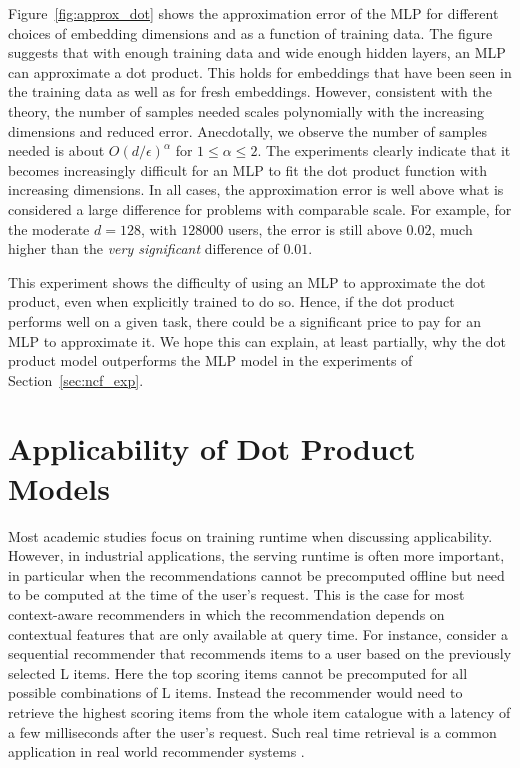 \documentclass{article}
\begin{document}
Figure~\ref{fig:approx_dot} shows the approximation error of the MLP for different choices of embedding dimensions and as a function of training data.
The figure suggests that with enough training data and wide enough hidden layers, an MLP can approximate a dot product.
This holds for embeddings that have been seen in the training data as well as for fresh embeddings.
However, consistent with the theory, the number of samples needed scales polynomially with the increasing dimensions and reduced error. Anecdotally, we observe the number of samples needed is about $O(d/\epsilon)^{\alpha}$ for $1\leq \alpha \leq 2$.
The experiments clearly indicate that it becomes increasingly difficult for an MLP to fit the dot product function with increasing dimensions.
In all cases, the approximation error is well above what is considered a large difference for problems with comparable scale. For example, for the moderate $d=128$, with $128000$ users, the error is still above $0.02$, much higher than the \emph{very significant} difference of $0.01$.

This experiment shows the difficulty of using an MLP to approximate the dot product, even when explicitly trained to do so.
Hence, if the dot product performs well on a given task, there could be a significant price to pay for an MLP to approximate it.
We hope this can explain, at least partially, why the dot product model outperforms the MLP model in the experiments of Section~\ref{sec:ncf_exp}.


\section{Applicability of Dot Product Models}
\label{sec:serving}

Most academic studies focus on training runtime when discussing applicability.
However, in industrial applications, the serving runtime is often more important, in particular when the recommendations cannot be precomputed offline but need to be computed at the time of the user's request. This is the case for most context-aware recommenders in which the recommendation depends on contextual features that are only available at query time.
For instance, consider a sequential recommender that recommends items to a user based on the previously selected L items.
Here the top scoring items cannot be precomputed for all possible combinations of L items.
Instead the recommender would need to retrieve the highest scoring items from the  whole item catalogue with a latency of a few milliseconds after the user's request.
Such real time retrieval is a common application in real world recommender systems \cite{covington:rs16}.
\end{document}
